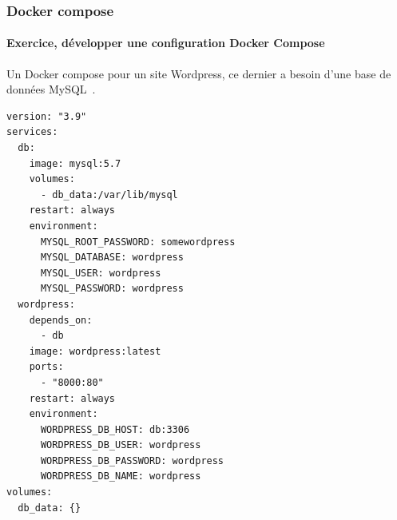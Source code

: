 \documentclass{beamer}
\begin{document}
    \begin{frame}[fragile]
        \transdissolve
        \frametitle{Docker compose}
        \framesubtitle{Exercice, développer une configuration Docker Compose}
        Un Docker compose pour un site Wordpress, ce dernier a besoin d'une base de données MySQL~.
        \pause
        \begin{lstlisting}[basicstyle=\ttfamily\tiny]
version: "3.9"
services:
  db:
    image: mysql:5.7
    volumes:
      - db_data:/var/lib/mysql
    restart: always
    environment:
      MYSQL_ROOT_PASSWORD: somewordpress
      MYSQL_DATABASE: wordpress
      MYSQL_USER: wordpress
      MYSQL_PASSWORD: wordpress
  wordpress:
    depends_on:
      - db
    image: wordpress:latest
    ports:
      - "8000:80"
    restart: always
    environment:
      WORDPRESS_DB_HOST: db:3306
      WORDPRESS_DB_USER: wordpress
      WORDPRESS_DB_PASSWORD: wordpress
      WORDPRESS_DB_NAME: wordpress
volumes:
  db_data: {}
        \end{lstlisting}
    \end{frame}
\end{document}
